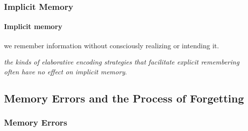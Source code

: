 \documentclass{article}
\begin{document}
	\subsubsection{Implicit Memory}
	\paragraph{Implicit memory} we remember information without consciously realizing or intending it.
	
	\emph{the kinds of elaborative encoding strategies that facilitate explicit remembering often have no effect on implicit memory}.
	
	\subsection{Memory Errors and the Process of Forgetting}
	\subsubsection{Memory Errors}
\end{document}
